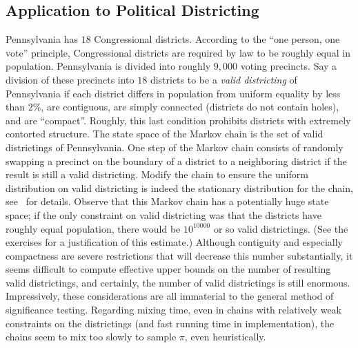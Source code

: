 \documentclass[12pt]{article}
\begin{document}
\subsection*{Application to Political Districting}

Pennsylvania has \( 18 \) Congressional districts.  According to the
``one person, one vote'' principle, Congressional districts are required
by law to be roughly equal in population. Pennsylvania is divided into
roughly \( 9,000 \) voting precincts.  Say a division of these
precincts into \( 18 \) districts to be a \emph{valid districting} of
Pennsylvania if each district differs in population from uniform
equality by less than \( 2\% \), are contiguous, are simply connected (districts
do not contain holes), and are ``compact''.  Roughly, this last
condition prohibits districts with extremely contorted structure.  The
state space of the Markov chain is the set of valid districtings of
Pennsylvania. One step of the Markov chain consists of randomly swapping
a precinct on the boundary of a district to a neighboring district if
the result is still a valid districting.  Modify the chain
to ensure the uniform distribution on valid districting is
indeed the stationary distribution for the chain, see~%
\cite{chikina2860si} for details. Observe that this Markov chain has a
potentially huge state space; if the only constraint on valid
districting was that the districts have roughly equal population, there
would be \( 10^{10000} \) or so valid districtings.  (See the exercises
for a justification of this estimate.) Although contiguity and
especially compactness are severe restrictions that will decrease this
number substantially, it seems difficult to compute effective upper
bounds on the number of resulting valid districtings, and certainly, the
number of valid districtings is still enormous.  Impressively, these
considerations are all immaterial to the general method of significance
testing.  Regarding mixing time, even in chains with relatively weak
constraints on the districtings (and fast running time in implementation),
the chains seem to mix too slowly to sample \( \pi \), even
heuristically.
\end{document}
